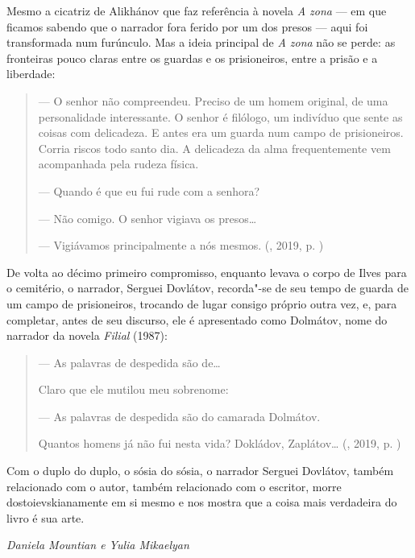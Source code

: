 Mesmo a cicatriz de Alikhánov que faz referência à novela \emph{A zona} --- em
que ficamos sabendo que o narrador fora ferido por um dos presos --- aqui
foi transformada num furúnculo. Mas a ideia principal de \emph{A zona}
não se perde: as fronteiras pouco claras entre os guardas e os
prisioneiros, entre a prisão e a liberdade:

\begin{quotation}
--- O senhor não compreendeu. Preciso de um homem original, de uma
personalidade interessante. O senhor é filólogo, um indivíduo que sente
as coisas com delicadeza. E antes era um guarda num campo de
prisioneiros. Corria riscos todo santo dia. A delicadeza da alma
frequentemente vem acompanhada pela rudeza física.

--- Quando é que eu fui rude com a senhora?

--- Não comigo. O senhor vigiava os presos\ldots{}

--- Vigiávamos principalmente a nós mesmos. 
{}(, 2019, p. \pageref{ref8})
\end{quotation}

De volta ao décimo primeiro compromisso, enquanto levava o corpo de
Ilves para o cemitério, o narrador, Serguei Dovlátov, recorda"-se de seu
tempo de guarda de um campo de prisioneiros, trocando de lugar consigo
próprio outra vez, e, para completar, antes de seu discurso, ele é
apresentado como Dolmátov, nome do narrador da novela \emph{Filial}
(1987):

\begin{quotation}
--- As palavras de despedida são de\ldots{}

Claro que ele mutilou meu sobrenome:

--- As palavras de despedida são do camarada Dolmátov.

Quantos homens já não fui nesta vida? Dokládov, Zaplátov\ldots{}
{}(, 2019, p. \pageref{ref9})
\end{quotation}

Com o duplo do duplo, o sósia do sósia, o narrador Serguei Dovlátov,
também relacionado com o autor, também relacionado com o escritor, morre
dostoievskianamente em si mesmo e nos mostra que a coisa mais verdadeira
do livro é sua arte.

\vfill
\begin{flushright}
\emph{Daniela Mountian e Yulia Mikaelyan}
\end{flushright}
